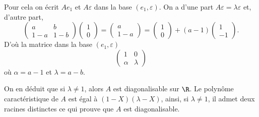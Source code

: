{\begin{enumerate}
{Pour cela on \'ecrit $Ae_1$ et $A\varepsilon$ dans la base $(e_1,\varepsilon)$. 
On a d'une part $A\varepsilon=\lambda\varepsilon$ et, d'autre part,
$$\begin{pmatrix}a&b \\ 1-a&1-b\end{pmatrix}\begin{pmatrix}1 \\  0\end{pmatrix}=\begin{pmatrix}a \\  1-a\end{pmatrix}
=\begin{pmatrix}1 \\  0\end{pmatrix}+(a-1)\begin{pmatrix}1 \\  -1\end{pmatrix}.$$ 
D'o\`u la matrice dans la base $(e_1,\varepsilon)$
$$\begin{pmatrix}1&0 \\  \alpha&\lambda\end{pmatrix}$$
o\`u $\alpha=a-1$ et $\lambda=a-b$.

On en d\'eduit que si $\lambda\neq 1$, alors $A$ est diagonalisable sur $\R$.
Le polyn\^ome caract\'eristique de $A$ est \'egal \`a $(1-X)(\lambda-X)$, ainsi, si $\lambda\neq 1$, il admet deux racines distinctes ce qui prouve que $A$ est diagonalisable.}
\end{enumerate}
}